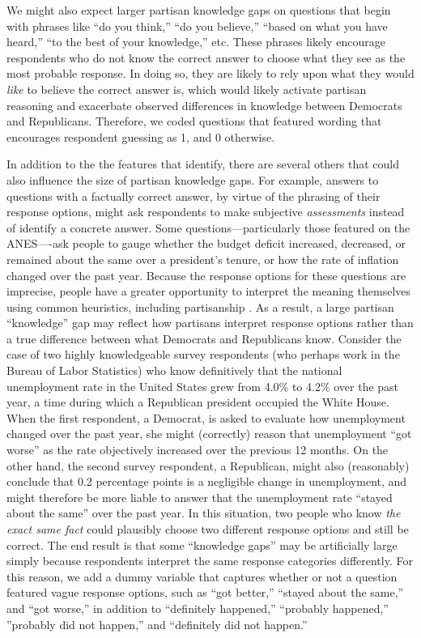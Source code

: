 \documentclass[12pt, letterpaper]{article}
\begin{document}
We might also expect larger partisan knowledge gaps on questions that begin with phrases like ``do you think,'' ``do you believe,'' ``based on what you have heard,'' ``to the best of your knowledge,'' etc. These phrases likely encourage respondents who do not know the correct answer to choose what they see as the most probable response. In doing so, they are likely to rely upon what they would \textit{like} to believe the correct answer is, which would likely activate partisan reasoning and exacerbate observed differences in knowledge between Democrats and Republicans. Therefore, we coded questions that featured wording that encourages respondent guessing as 1, and 0 otherwise. 

In addition to the the features that \citet{luskinetal_nd} identify, there are several others that could also influence the size of partisan knowledge gaps. For example, answers to questions with a factually correct answer, by virtue of the phrasing of their response options, might ask respondents to make subjective \textit{assessments} instead of identify a concrete answer. Some questions---particularly those featured on the ANES----ask people to gauge whether the budget deficit increased, decreased, or remained about the same over a president's tenure, or how the rate of inflation changed over the past year. Because the response options for these questions are imprecise, people have a greater opportunity to interpret the meaning themselves \citep[e.g.][]{beyth_1982} using common heuristics, including partisanship \citep[e.g.][]{soodguess_2017}. As a result, a large partisan ``knowledge'' gap may reflect how partisans interpret response options rather than a true difference between what Democrats and Republicans know. Consider the case of two highly knowledgeable survey respondents (who perhaps work in the Bureau of Labor Statistics) who know definitively that the national unemployment rate in the United States grew from 4.0\% to 4.2\% over the past year, a time during which a Republican president occupied the White House. When the first respondent, a Democrat, is asked to evaluate how unemployment changed over the past year, she might (correctly) reason that unemployment ``got worse'' as the rate objectively increased over the previous 12 months. On the other hand, the second survey respondent, a Republican, might also (reasonably) conclude that 0.2 percentage points is a negligible change in unemployment, and might therefore be more liable to answer that the unemployment rate  ``stayed about the same'' over the past year. In this situation, two people who know \textit{the exact same fact} could plausibly choose two different response options and still be correct. The end result is that some ``knowledge gaps'' may be artificially large simply because respondents interpret the same response categories differently. For this reason, we add a dummy variable that captures whether or not a question featured vague response options, such as ``got better,'' ``stayed about the same,'' and ``got worse,'' in addition to ``definitely happened,'' ``probably happened,'' ''probably did not happen,'' and ``definitely did not happen.''
\end{document}
